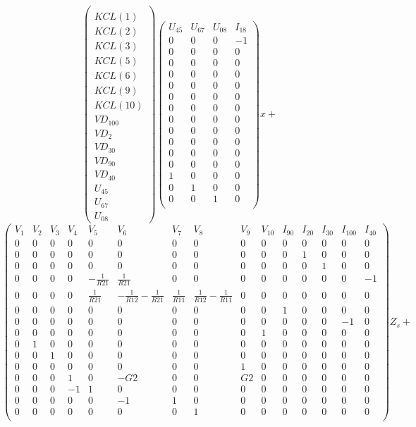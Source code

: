 \[
\left(\begin{array}{c}
  \\
KCL(1)\\KCL(2)\\KCL(3)\\KCL(5)\\KCL(6)\\KCL(9)\\KCL(10)\\VD_{100}\\VD_{2}\\VD_{30}\\VD_{90}\\VD_{40}\\U_{45}\\U_{67}\\U_{08}
\end{array}\right)
\left(\begin{array}{cccc}
  U_{45}&U_{67}&U_{08}&I_{18}\\
  \hline
  0&0&0&-1\\
  0&0&0&0\\
  0&0&0&0\\
  0&0&0&0\\
  0&0&0&0\\
  0&0&0&0\\
  0&0&0&0\\
  0&0&0&0\\
  0&0&0&0\\
  0&0&0&0\\
  0&0&0&0\\
  0&0&0&0\\
  1&0&0&0\\
  0&1&0&0\\
  0&0&1&0\\
\end{array}\right)x+\]
\[
\left(\begin{array}{ccccccccccccccc}
  V_{1}&V_{2}&V_{3}&V_{4}&V_{5}&V_{6}&V_{7}&V_{8}&V_{9}&V_{10}&I_{90}&I_{20}&I_{30}&I_{100}&I_{40}\\
  \hline
  0&0&0&0&0&0&0&0&0&0&0&0&0&0&0\\
  0&0&0&0&0&0&0&0&0&0&0&1&0&0&0\\
  0&0&0&0&0&0&0&0&0&0&0&0&1&0&0\\
  0&0&0&0&-\frac{1}{R21}&\frac{1}{R21}&0&0&0&0&0&0&0&0&-1\\
  0&0&0&0&\frac{1}{R21}&-\frac{1}{R12}-\frac{1}{R21}&\frac{1}{R11}&\frac{1}{R12}-\frac{1}{R11}&0&0&0&0&0&0&0\\
  0&0&0&0&0&0&0&0&0&0&1&0&0&0&0\\
  0&0&0&0&0&0&0&0&0&0&0&0&0&-1&0\\
  0&0&0&0&0&0&0&0&0&1&0&0&0&0&0\\
  0&1&0&0&0&0&0&0&0&0&0&0&0&0&0\\
  0&0&1&0&0&0&0&0&0&0&0&0&0&0&0\\
  0&0&0&0&0&0&0&0&1&0&0&0&0&0&0\\
  0&0&0&1&0&-G2&0&0&G2&0&0&0&0&0&0\\
  0&0&0&-1&1&0&0&0&0&0&0&0&0&0&0\\
  0&0&0&0&0&-1&1&0&0&0&0&0&0&0&0\\
  0&0&0&0&0&0&0&1&0&0&0&0&0&0&0\\
\end{array}\right)Z_{s}+\]
